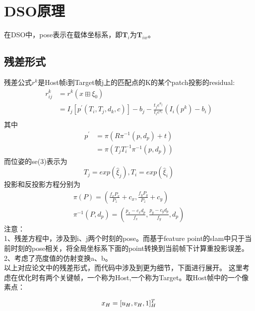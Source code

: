 \chapter{DSO原理}


在DSO中，pose表示在载体坐标系，即$\textbf{T}_{i}$为$\textbf{T}_{iw}$。

\section{残差形式}	
残差公式$r^k$是Host帧i到Target帧j上的匹配点的K的某个patch投影的residual:
\begin{equation} \label{eq:residual}
\begin{aligned} %
r_{ij}^k &= r^k(x \boxplus \xi_{0})\\
         &= I_{j}[p^{'}(T_{i},T_{j},d_{k},c)]-b_{j}-\frac{t_{j}e^{a_{j}}}{t_{i}e^{a_{i}}}(I_{i}(p^k)-b_{i}) \\ 
\end{aligned}
\end{equation}
其中
\begin{equation}
\begin{aligned} \label{eq:p}
p^{'} &= \pi(R\pi^{-1}(p,d_{p})+t)\\
&= \pi(T_{j}T_{i}^{-1}\pi^{-1}(p,d_{p}))
\end{aligned}
\end{equation}
而位姿的se(3)表示为
\begin{equation}
   T_{j}=exp(\hat{\xi}_{j}),T_{i}=exp(\hat{\xi}_{i})
\end{equation}
投影和反投影方程分别为
\begin{align}
	\pi(P)=(\frac{f_{x}P_{x}}{P_{z}}+c_{x},\frac{f_{y}P_{y}}{P_{z}}+c_{y})\\
	\pi^{-1}(P,d_{p})=(\frac{p_{x}-c_{x}d_{p}}{f_{x}},\frac{p_{y}-c_{y}d_{p}}{f_{y}},d_{p})
\end{align}
注意：\\
1、残差方程中，涉及到i、j两个时刻的pose。而基于feature point的slam中只于当前时刻的pose相关，将全局坐标系下面的point转换到当前帧下计算重投影误差。\\
2、考虑了亮度值的仿射变换a、b。\\

以上对应论文中的残差形式，而代码中涉及到更为细节，下面进行展开。
这里考虑在优化时有两个关键帧，一个称为Host,一个称为Target。取Host帧中的一个像素点：

\begin{equation}
	x_{H}=[u_{H},v_{H},1]_{H}^{T}\\
\end{equation}

